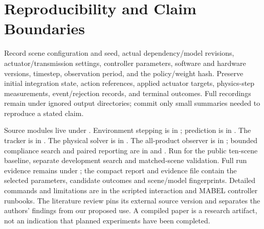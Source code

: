 \section{Reproducibility and Claim Boundaries}
Record scene configuration and seed, actual dependency/model revisions,
actuator/transmission settings, controller parameters, software and hardware
versions, timestep, observation period, and the policy/weight hash. Preserve
initial integration state, action references, applied actuator targets,
physics-step measurements, event/rejection records, and terminal outcomes.
Full recordings remain under ignored output directories; commit only small
summaries needed to reproduce a stated claim.

Source modules live under .
Environment stepping is in ; prediction is in .
The tracker is in .
The physical solver is in .
The all-product observer is in ; bounded compliance search
and paired reporting are in  and .
Run  for the public ten-scene baseline,
separate development search and matched-scene validation. Full run evidence
remains under ; the compact report and evidence file contain the
selected parameters, candidate outcomes and scene/model fingerprints.
Detailed commands and limitations are in the scripted interaction and MABEL
controller runbooks.
The literature review pins its external source version and separates the
authors' findings from our proposed use. A compiled paper is a research artifact,
not an indication that planned experiments have been completed.
